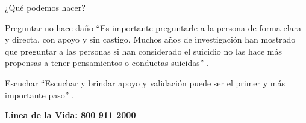 \begin{frame}{¿Qué podemos hacer?}
  \begin{block}{Preguntar no hace daño}
    \small
    \enquote{Es importante preguntarle a la persona de forma clara y directa,
    con apoyo y sin castigo. Muchos años de investigación han mostrado que
    preguntar a las personas si han considerado el suicidio no las hace más
    propensas a tener pensamientos o conductas suicidas} \citep{conner2023}.
  \end{block}
  \begin{block}{Escuchar}
    \small
    \enquote{Escuchar y brindar apoyo y validación puede ser el primer y más
    importante paso} \citep{conner2023}.
  \end{block}
  \vspace{0.1cm}
  {\centering\bfseries\color{ColorPrincipal} Línea de la Vida: 800 911 2000\par}
\end{frame}
